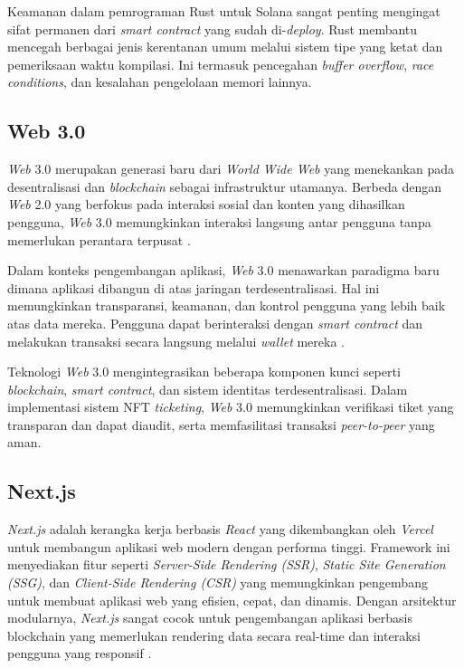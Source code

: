Keamanan dalam pemrograman Rust untuk Solana sangat penting mengingat sifat permanen dari \textit{smart contract} yang sudah di-\textit{deploy}. Rust membantu mencegah berbagai jenis kerentanan umum melalui sistem tipe yang ketat dan pemeriksaan waktu kompilasi. Ini termasuk pencegahan \textit{buffer overflow}, \textit{race conditions}, dan kesalahan pengelolaan memori lainnya.

\subsection{Web 3.0}
\textit{Web} 3.0 merupakan generasi baru dari \textit{World Wide Web} yang menekankan pada desentralisasi dan \textit{blockchain} sebagai infrastruktur utamanya. Berbeda dengan \textit{Web} 2.0 yang berfokus pada interaksi sosial dan konten yang dihasilkan pengguna, \textit{Web} 3.0 memungkinkan interaksi langsung antar pengguna tanpa memerlukan perantara terpusat \parencite{ref5}.

Dalam konteks pengembangan aplikasi, \textit{Web} 3.0 menawarkan paradigma baru dimana aplikasi dibangun di atas jaringan terdesentralisasi. Hal ini memungkinkan transparansi, keamanan, dan kontrol pengguna yang lebih baik atas data mereka. Pengguna dapat berinteraksi dengan \textit{smart contract} dan melakukan transaksi secara langsung melalui \textit{wallet} mereka \parencite{ref8}.

Teknologi \textit{Web} 3.0 mengintegrasikan beberapa komponen kunci seperti \textit{blockchain}, \textit{smart contract}, dan sistem identitas terdesentralisasi. Dalam implementasi sistem NFT \textit{ticketing}, \textit{Web} 3.0 memungkinkan verifikasi tiket yang transparan dan dapat diaudit, serta memfasilitasi transaksi \textit{peer-to-peer} yang aman.


\subsection{Next.js}

\textit{Next.js} adalah kerangka kerja berbasis \textit{React} yang dikembangkan oleh \textit{Vercel} untuk membangun aplikasi web modern dengan performa tinggi. Framework ini menyediakan fitur seperti \textit{Server-Side Rendering (SSR)}, \textit{Static Site Generation (SSG)}, dan \textit{Client-Side Rendering (CSR)} yang memungkinkan pengembang untuk membuat aplikasi web yang efisien, cepat, dan dinamis. Dengan arsitektur modularnya, \textit{Next.js} sangat cocok untuk pengembangan aplikasi berbasis blockchain yang memerlukan rendering data secara real-time dan interaksi pengguna yang responsif \parencite{ref5}.

